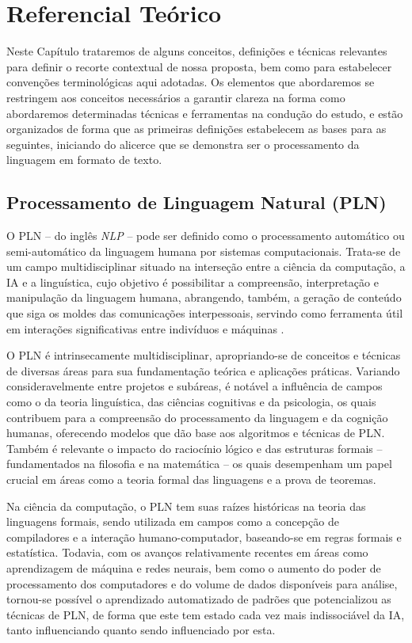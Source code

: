 \chapter{Referencial Teórico}
\label{cap:Teorico}

Neste Capítulo trataremos de alguns conceitos, definições e técnicas relevantes para definir o recorte contextual de nossa proposta, bem como para estabelecer convenções terminológicas aqui adotadas. Os elementos que abordaremos se restringem aos conceitos necessários a garantir clareza na forma como abordaremos determinadas técnicas e ferramentas na condução do estudo, e estão organizados de forma que as primeiras definições estabelecem as bases para as seguintes, iniciando do alicerce que se demonstra ser o processamento da linguagem em formato de texto.

\section{Processamento de Linguagem Natural (PLN)}
\label{sec:Teorico.1}

O \ac{PLN} -- do inglês \textit{\ac{NLP}} -- pode ser definido como o processamento automático ou semi-automático da linguagem humana por sistemas computacionais. Trata-se de um campo multidisciplinar situado na interseção entre a ciência da computação, a \ac{IA} e a linguística, cujo objetivo é possibilitar a compreensão, interpretação e manipulação da linguagem humana, abrangendo, também, a geração de conteúdo que siga os moldes das comunicações interpessoais, servindo como ferramenta útil em interações significativas entre indivíduos e máquinas \cite{PNL-Cambridge:}.

O \ac{PLN} é intrinsecamente multidisciplinar, apropriando-se de conceitos e técnicas de diversas áreas para sua fundamentação teórica e aplicações práticas. Variando consideravelmente entre projetos e subáreas, é notável a influência de campos como o da teoria linguística, das ciências cognitivas e da psicologia, os quais contribuem para a compreensão do processamento da linguagem e da cognição humanas, oferecendo modelos que dão base aos algoritmos e técnicas de \ac{PLN}. Também é relevante o impacto do raciocínio lógico e das estruturas formais -- fundamentados na filosofia e na matemática -- os quais desempenham um papel crucial em áreas como a teoria formal das linguagens e a prova de teoremas.

Na ciência da computação, o \ac{PLN} tem suas raízes históricas na teoria das linguagens formais, sendo utilizada em campos como a concepção de compiladores e a interação humano-computador, baseando-se em regras formais e estatística. Todavia, com os avanços relativamente recentes em áreas como aprendizagem de máquina e redes neurais, bem como o aumento do poder de processamento dos computadores e do volume de dados disponíveis para análise, tornou-se possível o aprendizado automatizado de padrões que potencializou as técnicas de \ac{PLN}, de forma que este tem estado cada vez mais indissociável da \ac{IA}, tanto influenciando quanto sendo influenciado por esta.

